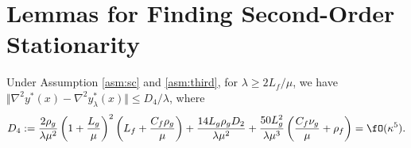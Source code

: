 \section{Lemmas for Finding Second-Order Stationarity} \label{apx:lem-2nd}


\begin{lem} \label{lem:nabla2-yx}
Under Assumption \ref{asm:sc} and \ref{asm:third}, 
for $\lambda \ge  2L_f / \mu$,
we have $ \Vert \nabla^2 y^*(x) -\nabla^2 y_{\lambda}^*(x)  \Vert \le D_4 /\lambda$, where 
\begin{align*}
    D_4 := \frac{2\rho_g}{\lambda \mu^2}  \left( 1 + \frac{L_g}{\mu}\right)^2  \left(L_f + 
     \frac{C_f \rho_g}{\mu}
     \right) +   \frac{14 L_g \rho_g D_2}{\lambda \mu^2} + \frac{50 L_g^2 }{\lambda \mu^3} \left( \frac{C_f \nu_g}{\mu} + \rho_f \right) = \fO(\kappa^5).
\end{align*}
\end{lem}

